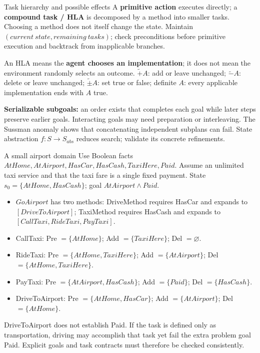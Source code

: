 \documentclass[10pt,a4paper]{article}
\begin{document}
\begin{card}{Task hierarchy and possible effects}
A \textbf{primitive action} executes directly; a \textbf{compound task / HLA} is decomposed by a method into smaller tasks. Choosing a method does not itself change the state. Maintain $(current\ state,remaining\ tasks)$; check preconditions before primitive execution and backtrack from inapplicable branches.

An HLA means the \textbf{agent chooses an implementation}; it does not mean the environment randomly selects an outcome. $\widetilde{+}A$: add or leave unchanged; $\widetilde{-}A$: delete or leave unchanged; $\widetilde{\pm}A$: set true or false; definite $A$: every applicable implementation ends with $A$ true.

\textbf{Serializable subgoals:} an order exists that completes each goal while later steps preserve earlier goals. Interacting goals may need preparation or interleaving. The Sussman anomaly shows that concatenating independent subplans can fail. State abstraction $f:S\to S_{abs}$ reduces search; validate its concrete refinements.
\end{card}

\begin{card}{A small airport domain}
Use Boolean facts $AtHome,AtAirport,HasCar,HasCash,TaxiHere,Paid$. Assume an unlimited taxi service and that the taxi fare is a single fixed payment. State $s_0=\{AtHome,HasCash\}$; goal $AtAirport\land Paid$.
\begin{itemize}
\item $GoAirport$ has two methods: DriveMethod requires HasCar and expands to $[DriveToAirport]$; TaxiMethod requires HasCash and expands to $[CallTaxi,RideTaxi,PayTaxi]$.
\item CallTaxi: Pre $=\{AtHome\}$; Add $=\{TaxiHere\}$; Del $=\varnothing$.
\item RideTaxi: Pre $=\{AtHome,TaxiHere\}$; Add $=\{AtAirport\}$; Del $=\{AtHome,TaxiHere\}$.
\item PayTaxi: Pre $=\{AtAirport,HasCash\}$; Add $=\{Paid\}$; Del $=\{HasCash\}$.
\item DriveToAirport: Pre $=\{AtHome,HasCar\}$; Add $=\{AtAirport\}$; Del $=\{AtHome\}$.
\end{itemize}
DriveToAirport does not establish Paid. If the task is defined only as transportation, driving may accomplish that task yet fail the extra problem goal Paid. Explicit goals and task contracts must therefore be checked consistently.
\end{card}
\end{document}
